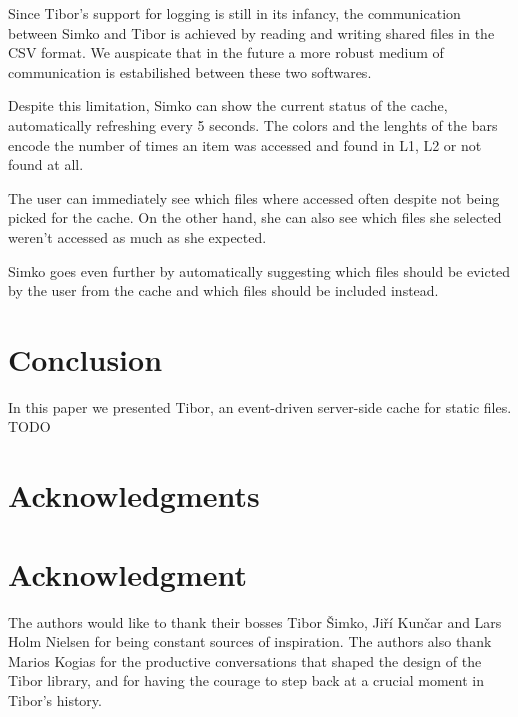 \documentclass[conference,compsoc]{IEEEtran}
\begin{document}
Since Tibor's support for logging is still in its infancy, the communication
between Simko and Tibor is achieved by reading and writing shared files in the
CSV format. We auspicate that in the future a more robust medium of
communication is estabilished between these two softwares.

Despite this limitation, Simko can show the current status of the cache,
automatically refreshing every 5 seconds. The colors and the lenghts of the
bars encode the number of times an item was accessed and found in L1, L2 or not
found at all.

The user can immediately see which files where accessed often despite not being
picked for the cache. On the other hand, she can also see which files she
selected weren't accessed as much as she expected.

Simko goes even further by automatically suggesting which files should be
evicted by the user from the cache and which files should be included instead.

\section{Conclusion}
In this paper we presented Tibor, an event-driven server-side cache for static
files. TODO

\ifCLASSOPTIONcompsoc
  \section*{Acknowledgments}
\else
  \section*{Acknowledgment}
\fi

The authors would like to thank their bosses Tibor Šimko, Jiří Kunčar and Lars
Holm Nielsen for being constant sources of inspiration. The authors also thank
Marios Kogias for the productive conversations that shaped the design of the
Tibor library, and for having the courage to step back at a crucial moment in
Tibor's history.
\end{document}
